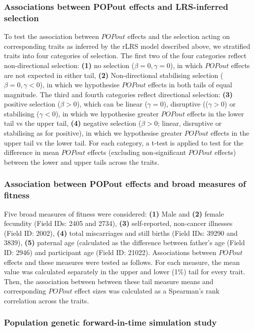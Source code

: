 \documentclass[12pt]{zHenriquesLab-StyleBioRxiv}
\begin{document}
\subsubsection*{Associations between POPout effects and LRS-inferred selection}
To test the association between $POPout$ effects and the selection acting on 
corresponding traits as inferred by the rLRS model described above, we stratified 
traits into four categories of selection. The first two of the four categories reflect non-directional 
selection: \textbf{(1)} no selection ($\beta=0,\gamma=0$), in which $POPout$ 
effects are not expected in either tail, \textbf{(2)} Non-directional stabilising 
selection ($\beta=0,\gamma<0$), in which we hypothesise $POPout$ effects 
in both tails of equal magnitude. The third and fourth categories reflect directional selection: 
\textbf{(3)} positive selection ($\beta>0$), which can be linear ($\gamma=0$), disruptive 
(($\gamma>0$) or stabilising ($\gamma<0$), in which we hypothesise greater 
$POPout$ effects in the lower tail vs the upper tail, \textbf{(4)} negative 
selection ($\beta>0$; linear, disruptive or stabilising as for positive), in which we 
hypothesise greater $POPout$ effects in the upper tail vs the lower tail. For each category, 
a t-test is applied to test for the difference in mean $POPout$ effects (excluding non-significant 
$POPout$ effects) between the lower and upper tails across the traits.

\subsubsection*{Association between POPout effects and broad measures of fitness}
Five broad measures of fitness were considered: \textbf{(1)} Male and \textbf{(2)} female 
fecundity (Field IDs: 2405 and 2734), \textbf{(3)} self-reported, non-cancer illnesses 
(Field ID: 2002), \textbf{(4)} total miscarriages and still births (Field IDs: 39290 and 3839), 
\textbf{(5)} paternal age (calculated as the difference between father's age (Field ID: 2946) 
and participant age (Field ID: 21022). Associations between $POPout$ effects and these 
measures were tested as follows. For each measure, the mean value was calculated 
separately in the upper and lower (1\%) tail for every trait. Then, the association between 
between these tail measure means and corresponding $POPout$ effect sizes was 
calculated as a Spearman's rank correlation across the traits.



\subsubsection*{Population genetic forward-in-time simulation study} \label{sec:methods:sims} 
\end{document}
